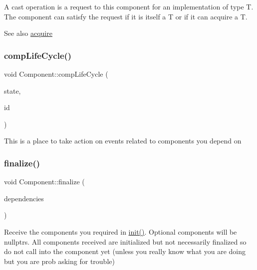 A cast operation is a request to this component for an implementation of type T. The component can satisfy the request if it is itself a T or if it can acquire a T. \begin{DoxySeeAlso}{See also}
\hyperlink{classtheoria_1_1core_1_1Component_a18744abc83e088af3c3d42e0a22c35e3}{acquire} 
\end{DoxySeeAlso}
\mbox{\label{classtheoria_1_1core_1_1Component_a92578e2b6253681a21b91e7c22b22975}} 
\subsubsection{\texorpdfstring{comp\+Life\+Cycle()}{compLifeCycle()}}
{\footnotesize\ttfamily void Component\+::comp\+Life\+Cycle (\begin{DoxyParamCaption}\item[{Comp\+Life\+Cycle}]{state,  }\item[{Comp\+Id}]{id }\end{DoxyParamCaption})\hspace{0.3cm}{\ttfamily [virtual]}}

This is a place to take action on events related to components you depend on \mbox{\label{classtheoria_1_1core_1_1Component_afd8acc89e2cd36e92bebe7e6fa530764}} 
\subsubsection{\texorpdfstring{finalize()}{finalize()}}
{\footnotesize\ttfamily void Component\+::finalize (\begin{DoxyParamCaption}\item[{const std\+::vector$<$ \hyperlink{classtheoria_1_1core_1_1Component}{Component} $\ast$$>$ \&}]{dependencies }\end{DoxyParamCaption})\hspace{0.3cm}{\ttfamily [virtual]}}

Receive the components you required in \hyperlink{classtheoria_1_1core_1_1Component_a7ed45f6e38442a40666ae4556f794f7d}{init()}. Optional components will be nullptrs. All components received are initialized but not necessarily finalized so do not call into the component yet (unless you really know what you are doing but you are prob asking for trouble) 

